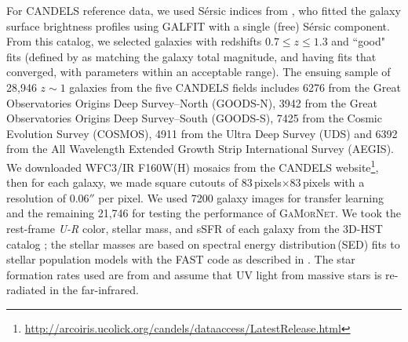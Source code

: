 \documentclass[twocolumn]{aastex63}
\newcommand\sersic{S\'ersic}
\newcommand\gamornet{G\textsc{a}M\textsc{or}N\textsc{et}}
\begin{document}
For CANDELS reference data, we used \sersic{} indices from \citet{vdw_12}, who fitted the galaxy surface brightness profiles using GALFIT \citep{galfit} with a single (free) \sersic{} component. From this catalog, we selected galaxies with redshifts $0.7 \leq z \leq 1.3$ and ``good" fits (defined by \citealp{vdw_12} as matching the galaxy total magnitude, and having fits that converged, with parameters within an acceptable range). The ensuing sample of 28,946 $z\sim1$ galaxies from the five CANDELS fields includes 6276 from the Great Observatories Origins Deep Survey--North (GOODS-N), 3942 from the Great Observatories Origins Deep Survey--South (GOODS-S), 7425 from the Cosmic Evolution Survey (COSMOS), 4911 from the Ultra Deep Survey (UDS) and 6392 from the All Wavelength Extended Growth Strip International Survey (AEGIS). We downloaded WFC3/IR F160W(H) mosaics from the CANDELS website\footnote{\href{http://arcoiris.ucolick.org/candels/data\textunderscore access/Latest\textunderscore Release.html}{http://arcoiris.ucolick.org/candels/data\textunderscore access/Latest\textunderscore Release.html}}, then for each galaxy, we made square cutouts of $83$\,pixels$\times83$\,pixels with a resolution of $0.06''$ per pixel. We used 7200 galaxy images for transfer learning and the remaining 21,746 for testing the performance of \gamornet{}. We took the rest-frame \textit{U-R} color, stellar mass, and sSFR of each galaxy from the 3D-HST catalog \citep{3dhst}; the stellar masses are based on spectral energy distribution\,(SED) fits to stellar population models with the FAST code \citep{fast} as described in \citet{skelton_14}. The star formation rates used are from \cite{whitaker_14} and assume that UV light from massive stars is re-radiated in the far-infrared.
\end{document}

